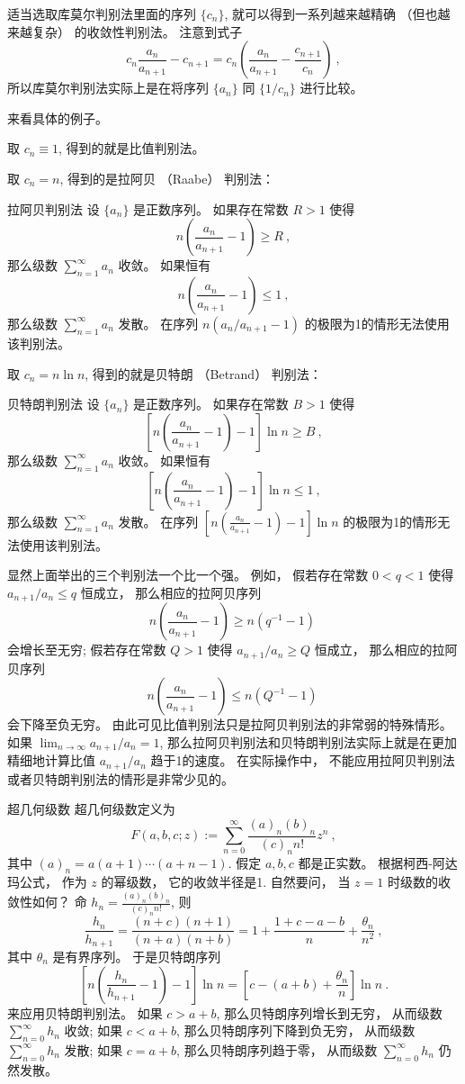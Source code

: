 适当选取库莫尔判别法里面的序列 $\{c_n\}$, 就可以得到一系列越来越精确 （但也越来越复杂） 的收敛性判别法。 注意到式子
$$
c_n\frac{a_n}{a_{n+1}}-c_{n+1}=c_n\left(\frac{a_n}{a_{n+1}}-\frac{c_{n+1}}{c_n}\right)~,
$$
所以库莫尔判别法实际上是在将序列 $\{a_n\}$ 同 $\{1/c_n\}$ 进行比较。

来看具体的例子。 

取 $c_n\equiv1$, 得到的就是比值判别法。

取 $c_n=n$, 得到的是拉阿贝 （Raabe） 判别法：

\begin{theorem}{拉阿贝判别法}
设 $\{a_n\}$ 是正数序列。 如果存在常数 $R>1$ 使得
$$
n\left(\frac{a_n}{a_{n+1}}-1\right)\geq R~,
$$
那么级数 $\sum_{n=1}^\infty a_n$ 收敛。 如果恒有
$$
n\left(\frac{a_n}{a_{n+1}}-1\right)\leq 1~,
$$
那么级数 $\sum_{n=1}^\infty a_n$ 发散。 在序列 $n(a_n/a_{n+1}-1)$ 的极限为1的情形无法使用该判别法。
\end{theorem}

取 $c_n=n\ln n$, 得到的就是贝特朗 （Betrand） 判别法：
\begin{theorem}{贝特朗判别法}
设 $\{a_n\}$ 是正数序列。 如果存在常数 $B>1$ 使得
$$
\left[n\left(\frac{a_n}{a_{n+1}}-1\right)-1\right]\ln n\geq B~,
$$
那么级数 $\sum_{n=1}^\infty a_n$ 收敛。 如果恒有
$$
\left[n\left(\frac{a_n}{a_{n+1}}-1\right)-1\right]\ln n\leq1~,
$$
那么级数 $\sum_{n=1}^\infty a_n$ 发散。 在序列 $\left[n\left(\frac{a_n}{a_{n+1}}-1\right)-1\right]\ln n$ 的极限为1的情形无法使用该判别法。
\end{theorem}

显然上面举出的三个判别法一个比一个强。 例如， 假若存在常数 $0<q<1$ 使得 $a_{n+1}/a_{n}\leq q$ 恒成立， 那么相应的拉阿贝序列
$$
n\left(\frac{a_n}{a_{n+1}}-1\right)\geq n(q^{-1}-1)~
$$
会增长至无穷; 假若存在常数 $Q>1$ 使得 $a_{n+1}/a_{n}\geq Q$ 恒成立， 那么相应的拉阿贝序列
$$
n\left(\frac{a_n}{a_{n+1}}-1\right)\leq n(Q^{-1}-1)~
$$
会下降至负无穷。 由此可见比值判别法只是拉阿贝判别法的非常弱的特殊情形。 如果 $\lim_{n\to\infty}a_{n+1}/a_{n}=1$, 那么拉阿贝判别法和贝特朗判别法实际上就是在更加精细地计算比值 $a_{n+1}/a_{n}$ 趋于1的速度。 在实际操作中， 不能应用拉阿贝判别法或者贝特朗判别法的情形是非常少见的。

\begin{example}{超几何级数}
超几何级数定义为
$$
F(a,b,c;z):=\sum_{n=0}^\infty\frac{(a)_n(b)_n}{(c)_nn!}z^{n}~,
$$
其中 $(a)_n=a(a+1)\dotsm(a+n-1)$. 假定 $a,b,c$ 都是正实数。 根据柯西-阿达玛公式， 作为 $z$ 的幂级数， 它的收敛半径是1. 自然要问， 当 $z=1$ 时级数的收敛性如何？ 
命 $h_n=\frac{(a)_n(b)_n}{(c)_nn!}$, 则
$$
\frac{h_n}{h_{n+1}}=\frac{(n+c)(n+1)}{(n+a)(n+b)}
=1+\frac{1+c-a-b}{n}+\frac{\theta_n}{n^2}~,
$$
其中 $\theta_n$ 是有界序列。 于是贝特朗序列
$$
\left[n\left(\frac{h_n}{h_{n+1}}-1\right)-1\right]\ln n
=\left[c-(a+b)+\frac{\theta_n}{n}\right]\ln n~.
$$
来应用贝特朗判别法。 如果 $c>a+b$, 那么贝特朗序列增长到无穷， 从而级数 $\sum_{n=0}^\infty h_n$ 收敛; 如果 $c<a+b$, 那么贝特朗序列下降到负无穷， 从而级数 $\sum_{n=0}^\infty h_n$ 发散; 如果 $c=a+b$, 那么贝特朗序列趋于零， 从而级数 $\sum_{n=0}^\infty h_n$ 仍然发散。
\end{example}